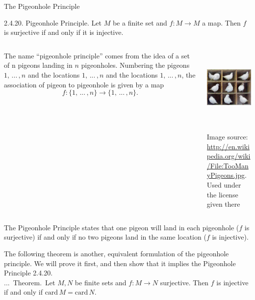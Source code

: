 \documentclass[smaller,hyperref={CJKbookmarks=true}]{beamer}
\newcounter{zhuo}[subsection]
\renewcommand{\thezhuo}{\thesection.\thesubsection.\arabic{zhuo}}
\newenvironment{THEOREM}{\stepcounter{zhuo}\alert{\thezhuo.~Theorem.\,}}{}
\begin{document}
\begin{frame}{The Pigeonhole Principle}
\begin{spacing}{1.1}
\alert{2.4.20. Pigeonhole Principle.} Let $M$ be a finite set and $f:M\to M$ a map. Then $f$ is surjective if and only if it is injective.\\[5pt]
\begin{columns}[onlytextwidth]
\begin{column}{0.5\textwidth}
The name ``pigeonhole principle''
comes from the idea of a set of n pigeons
l\-a\-n\-d\-i\-n\-g in $n$ pigeonholes. Numbering
the pigeons $1,\,...\,,n$ and the locations $1,\,...\,,n$ and the locations $1,\,...\,,n$, the association of pigeon to pigeonhole is given by a map
\[f:\{1,\,...\,,n\}\to\{1,\,...\,,n\}.\]
\end{column}
\begin{column}{0.45\textwidth}
\includegraphics[width=\columnwidth,height=110pt]{pigeon.jpg}
\begin{center}
\vspace*{-7pt}
{\tiny Image source:\\
\url{http://en.wikipedia.org/wiki/File:TooManyPigeons.jpg}.\\[0.01pt]
\vspace*{-5pt}
Used under the license given there}
\end{center}
\end{column}
\end{columns}
The Pigeonhole Principle states that one pigeon will land in each
pigeonhole ($f$ is surjective) if and only if no two pigeons land in the same
location ($f$ is injective).
\end{spacing}
\newpage
\begin{spacing}{1}
The following theorem is another, equivalent formulation of the pigeonhole
principle. We will prove it first, and then show that it implies the
Pigeonhole Principle 2.4.20.\\[5pt]
\begin{THEOREM}
Let $M,N$ be finite sets and $f:M\to N$ surjective. Then $f$ is injective if and only if $\text{card}\,M=\text{card}\,N$.\\[6pt]

\end{THEOREM}
\end{spacing}
\end{frame}
\end{document}
